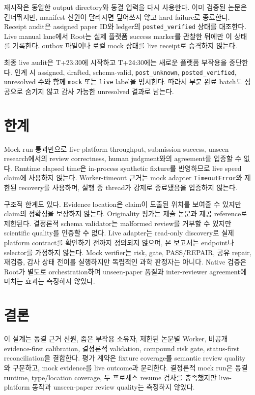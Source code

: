 \documentclass[11pt,a4paper]{article}
\begin{document}
재시작은 동일한 output directory와 동결 입력을 다시 사용한다. 이미 검증된
논문은 건너뛰지만, manifest 신원이 달라지면 덮어쓰지 않고 hard failure로
종료한다. Receipt audit은 assigned paper ID와 ledger의
\texttt{posted\_verified} 상태를 대조한다. Live manual lane에서 Root는 실제
플랫폼 success marker를 관찰한 뒤에만 이 상태를 기록한다. outbox 파일이나
로컬 mock 상태를 live receipt로 승격하지 않는다.

최종 live audit은 T+23:30에 시작하고 T+24:30에는 새로운 플랫폼 부작용을
중단한다. 인계 시 assigned, drafted, schema-valid, \texttt{post\_unknown},
\texttt{posted\_verified}, unresolved 수와 함께 \texttt{mock} 또는
\texttt{live} label을 명시한다. 따라서 부분 완료 batch도 성공으로 숨기지 않고
감사 가능한 unresolved 결과로 남는다.

\section{한계}

Mock run 통과만으로 live-platform throughput, submission success, unseen
research에서의 review correctness, human judgment와의 agreement를 입증할 수
없다. Runtime elapsed time은 in-process synthetic fixture를 반영하므로 live
speed claim에 사용하지 않는다. Worker-timeout 근거는 mock adapter
\texttt{TimeoutError}와 제한된 recovery를 사용하며, 실행 중 thread가 강제로
종료됐음을 입증하지 않는다.

구조적 한계도 있다. Evidence location은 claim이 도출된 위치를 보여줄 수
있지만 claim의 정확성을 보장하지 않는다. Originality 평가는 제출 논문과 제공
reference로 제한된다. 결정론적 schema validator는 malformed review를 거부할
수 있지만 scientific quality를 인증할 수 없다. Live adapter는 read-only
discovery로 실제 platform contract를 확인하기 전까지 정의되지 않으며, 본
보고서는 endpoint나 selector를 가정하지 않는다. Mock verifier는 risk, gate,
PASS/REPAIR, 공유 repair, 재검증, 감사 상태 전이를 실행하지만 독립적인 과학
판정자는 아니다. Native 검증은 Root가 별도로 orchestration하며 unseen-paper
품질과 inter-reviewer agreement에 미치는 효과는 측정하지 않았다.

\section{결론}

이 설계는 동결 근거 신원, 좁은 부작용 소유자, 제한된 논문별 Worker, 비공개
evidence-first calibration, 결정론적 validation, compound risk gate, status-first
reconciliation을 결합한다. 평가 계약은 fixture coverage를 semantic review
quality와 구분하고, mock evidence를 live outcome과 분리한다. 결정론적 mock
run은 동결 runtime, type/location coverage, 두 프로세스 resume 검사를
충족했지만 live-platform 동작과 unseen-paper review quality는 측정하지 않았다.
\end{document}
